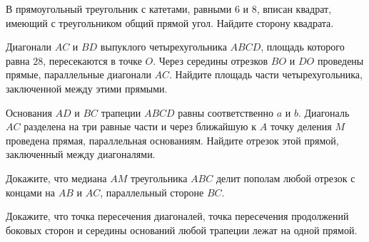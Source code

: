 %
%

\begin{class}[number=1]
	\begin{listofex}
		\item В прямоугольный треугольник с катетами, равными \(6\) и 8, вписан квадрат, имеющий с треугольником общий прямой угол. Найдите сторону квадрата.
		\item Диагонали \(AC\) и \(BD \) выпуклого четырехугольника \(ABCD\), площадь которого равна \(28\), пересекаются в точке \(O\). Через середины отрезков \(BO\) и \(DO\) проведены прямые, параллельные диагонали \(AC\). Найдите площадь части четырехугольника, заключенной между этими прямыми.
		\item Основания \(AD\) и \(BC\) трапеции \(ABCD\) равны соответственно \(a\) и \(b\). Диагональ \(AC\) разделена на три равные части и через ближайшую к \(A\) точку деления \(M\) проведена прямая, параллельная основаниям. Найдите отрезок этой прямой, заключенный между диагоналями.
		\item Докажите, что медиана \(AM\) треугольника \(ABC\) делит пополам любой отрезок с концами на \(AB\) и \(AC\), параллельный стороне \(BC\). 
		\item Докажите, что точка пересечения диагоналей, точка пересечения продолжений боковых сторон и середины оснований любой трапеции лежат на одной прямой.
	\end{listofex}
\end{class}

